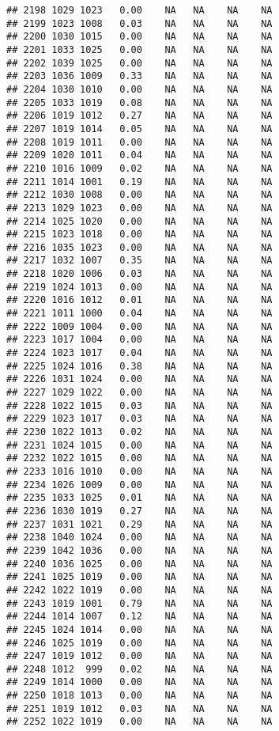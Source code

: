 \documentclass{article}\usepackage{graphicx, color}
\makeatletter
\newenvironment{kframe}{%
 \def\at@end@of@kframe{}%
 \ifinner\ifhmode%
  \def\at@end@of@kframe{\end{minipage}}%
  \begin{minipage}{\columnwidth}%
 \fi\fi%
 \def\FrameCommand##1{\hskip\@totalleftmargin \hskip-\fboxsep
 \colorbox{shadecolor}{##1}\hskip-\fboxsep
     \hskip-\linewidth \hskip-\@totalleftmargin \hskip\columnwidth}%
 \MakeFramed {\advance\hsize-\width
   \@totalleftmargin\z@ \linewidth\hsize
   \@setminipage}}%
 {\par\unskip\endMakeFramed%
 \at@end@of@kframe}
\newenvironment{knitrout}{}{} %
\makeatother
\begin{document}
\begin{knitrout}
\begin{kframe}
\begin{verbatim}
## 2198 1029 1023   0.00    NA   NA    NA    NA
## 2199 1023 1008   0.03    NA   NA    NA    NA
## 2200 1030 1015   0.00    NA   NA    NA    NA
## 2201 1033 1025   0.00    NA   NA    NA    NA
## 2202 1039 1025   0.00    NA   NA    NA    NA
## 2203 1036 1009   0.33    NA   NA    NA    NA
## 2204 1030 1010   0.00    NA   NA    NA    NA
## 2205 1033 1019   0.08    NA   NA    NA    NA
## 2206 1019 1012   0.27    NA   NA    NA    NA
## 2207 1019 1014   0.05    NA   NA    NA    NA
## 2208 1019 1011   0.00    NA   NA    NA    NA
## 2209 1020 1011   0.04    NA   NA    NA    NA
## 2210 1016 1009   0.02    NA   NA    NA    NA
## 2211 1014 1001   0.19    NA   NA    NA    NA
## 2212 1030 1008   0.00    NA   NA    NA    NA
## 2213 1029 1023   0.00    NA   NA    NA    NA
## 2214 1025 1020   0.00    NA   NA    NA    NA
## 2215 1023 1018   0.00    NA   NA    NA    NA
## 2216 1035 1023   0.00    NA   NA    NA    NA
## 2217 1032 1007   0.35    NA   NA    NA    NA
## 2218 1020 1006   0.03    NA   NA    NA    NA
## 2219 1024 1013   0.00    NA   NA    NA    NA
## 2220 1016 1012   0.01    NA   NA    NA    NA
## 2221 1011 1000   0.04    NA   NA    NA    NA
## 2222 1009 1004   0.00    NA   NA    NA    NA
## 2223 1017 1004   0.00    NA   NA    NA    NA
## 2224 1023 1017   0.04    NA   NA    NA    NA
## 2225 1024 1016   0.38    NA   NA    NA    NA
## 2226 1031 1024   0.00    NA   NA    NA    NA
## 2227 1029 1022   0.00    NA   NA    NA    NA
## 2228 1022 1015   0.03    NA   NA    NA    NA
## 2229 1023 1017   0.03    NA   NA    NA    NA
## 2230 1022 1013   0.02    NA   NA    NA    NA
## 2231 1024 1015   0.00    NA   NA    NA    NA
## 2232 1022 1015   0.00    NA   NA    NA    NA
## 2233 1016 1010   0.00    NA   NA    NA    NA
## 2234 1026 1009   0.00    NA   NA    NA    NA
## 2235 1033 1025   0.01    NA   NA    NA    NA
## 2236 1030 1019   0.27    NA   NA    NA    NA
## 2237 1031 1021   0.29    NA   NA    NA    NA
## 2238 1040 1024   0.00    NA   NA    NA    NA
## 2239 1042 1036   0.00    NA   NA    NA    NA
## 2240 1036 1025   0.00    NA   NA    NA    NA
## 2241 1025 1019   0.00    NA   NA    NA    NA
## 2242 1022 1019   0.00    NA   NA    NA    NA
## 2243 1019 1001   0.79    NA   NA    NA    NA
## 2244 1014 1007   0.12    NA   NA    NA    NA
## 2245 1024 1014   0.00    NA   NA    NA    NA
## 2246 1025 1019   0.00    NA   NA    NA    NA
## 2247 1019 1012   0.00    NA   NA    NA    NA
## 2248 1012  999   0.02    NA   NA    NA    NA
## 2249 1014 1000   0.00    NA   NA    NA    NA
## 2250 1018 1013   0.00    NA   NA    NA    NA
## 2251 1019 1012   0.03    NA   NA    NA    NA
## 2252 1022 1019   0.00    NA   NA    NA    NA

\end{verbatim}
\end{kframe}
\end{knitrout}
\end{document}
